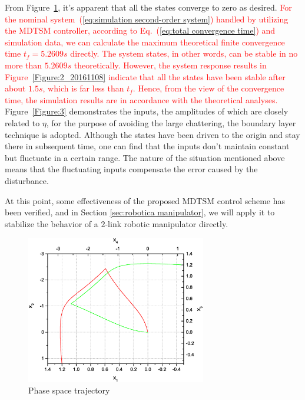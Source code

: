 \documentclass[3p]{elsarticle}
\theoremstyle{plain}
\theoremstyle{remark}
\begin{document}
From Figure~\ref{Figure:2}, it's apparent that all the states converge to zero as desired. \textcolor{red}{For the nominal system~(\ref{eq:simulation second-order system}) handled by utilizing the MDTSM controller, according to Eq.~(\ref{eq:total convergence time}) and simulation data, we can calculate the maximum theoretical finite convergence time $t_f=5.2609s$ directly. The system states, in other words, can be stable in no more than $5.2609s$ theoretically. However, the system response results in Figure~\ref{Figure:2_20161108} indicate that all the states have been stable after about $1.5s$, which is far less than $t_f$. Hence, from the view of the convergence time, the simulation results are in accordance with the theoretical analyses.} Figure~\ref{Figure:3} demonstrates the inputs, the amplitudes of which are closely related to $\eta$, for the purpose of avoiding the large chattering, the boundary layer technique is adopted. Although the states have been driven to the origin and stay there in subsequent time, one can find that the inputs don't maintain constant but fluctuate in a certain range. The nature of the situation mentioned above means that the fluctuating inputs compensate the error caused by the disturbance.\par
At this point, some effectiveness of the proposed MDTSM control scheme has been verified, and in Section \ref{sec:robotica manipulator}, we will apply it to stabilize the behavior of a $2$-link robotic manipulator directly.
\begin{figure}[http]
\centering
\includegraphics[width=0.7\textwidth]{paper3_fig2.eps}
\caption{Phase space trajectory}
\label{Figure:2}
\end{figure}
\end{document}
